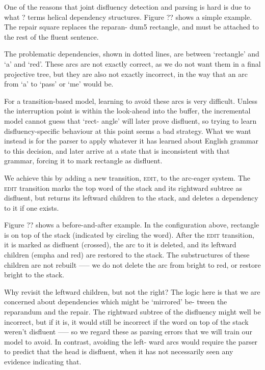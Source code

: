 \documentclass[11pt,letterpaper]{article}
\newcommand{\edittrans}{\textsc{edit}\xspace}
\begin{document}
One of the reasons that joint disfluency detection and parsing is hard is due to
what ? terms helical dependency structures. Figure ?? shows a simple example.
The repair square replaces the reparan- dum5 rectangle, and must be attached to
the rest of the fluent sentence.

The problematic dependencies, shown in dotted lines, are between `rectangle'
and `a' and `red'. These arcs are not exactly correct, as we do not want them in
a final projective tree, but they are also not exactly incorrect, in the way that
an arc from `a' to `pass' or `me' would be.

For a transition-based model, learning to avoid these arcs is very difficult.
Unless the interruption point is within the look-ahead into the buffer, the
incremental model cannot guess that ‘rect- angle’ will later prove disfluent,
so trying to learn disfluency-specific behaviour at this point seems a bad strategy.
What we want instead is for the parser to apply whatever it has learned about English
grammar to this decision, and later arrive at a state that is inconsistent with
that grammar, forcing it to mark rectangle as disfluent.

We achieve this by adding a new transition, \edittrans, to the arc-eager system.
The \edittrans transition marks the top word of the stack and its rightward subtree
as disfluent, but returns its leftward children to the stack, and deletes a
dependency to it if one exists.

Figure ?? shows a before-and-after example. In the configuration above, rectangle
is on top of the stack (indicated by circling the word). After the \textsc{edit}
transition, it is marked as disfluent (crossed), the arc to it is deleted, and its
leftward children (empha and red) are restored to the stack. The substructures
of these children are not rebuilt —-- we do not delete the arc from bright to red,
or restore bright to the stack.

Why revisit the leftward children, but not the right? The logic here is that we are
concerned about dependencies which might be ‘mirrored’ be- tween the reparandum
and the repair. The rightward subtree of the disfluency might well be incorrect,
but if it is, it would still be incorrect if the word on top of the stack weren’t
disfluent —-- so we regard these as parsing errors that we will train our model
to avoid. In contrast, avoiding the left- ward arcs would require the parser to
predict that the head is disfluent, when it has not necessarily seen any evidence
indicating that.
\end{document}
